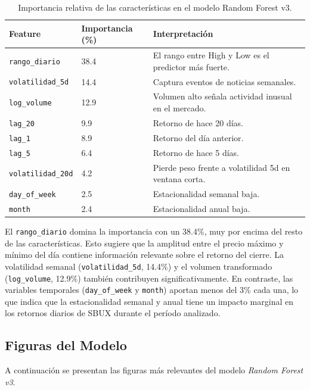 \documentclass[12pt,a4paper]{article}
\begin{document}
\begin{table}[H]
\centering
\caption{Importancia relativa de las características en el modelo Random Forest v3.}
\label{tab:importancia}
\small
\begin{tabular}{lp{2.5cm}p{7cm}}
\toprule
\textbf{Feature} & \textbf{Importancia (\%)} & \textbf{Interpretaci\'on} \\
\midrule
\texttt{rango\_diario}      & 38.4 & El rango entre High y Low es el predictor m\'as fuerte. \\
\texttt{volatilidad\_5d}    & 14.4 & Captura eventos de noticias semanales. \\
\texttt{log\_volume}        & 12.9 & Volumen alto se\~nala actividad inusual en el mercado. \\
\texttt{lag\_20}            & 9.9  & Retorno de hace 20 d\'ias. \\
\texttt{lag\_1}             & 8.9  & Retorno del d\'ia anterior. \\
\texttt{lag\_5}             & 6.4  & Retorno de hace 5 d\'ias. \\
\texttt{volatilidad\_20d}   & 4.2  & Pierde peso frente a volatilidad 5d en ventana corta. \\
\texttt{day\_of\_week}      & 2.5  & Estacionalidad semanal baja. \\
\texttt{month}              & 2.4  & Estacionalidad anual baja. \\
\bottomrule
\end{tabular}
\end{table}

El \texttt{rango\_diario} domina la importancia con un 38.4\%, muy por encima del resto de las características. Esto sugiere que la amplitud entre el precio máximo y mínimo del día contiene información relevante sobre el retorno del cierre. La volatilidad semanal (\texttt{volatilidad\_5d}, 14.4\%) y el volumen transformado (\texttt{log\_volume}, 12.9\%) también contribuyen significativamente. En contraste, las variables temporales (\texttt{day\_of\_week} y \texttt{month}) aportan menos del 3\% cada una, lo que indica que la estacionalidad semanal y anual tiene un impacto marginal en los retornos diarios de SBUX durante el período analizado.

\subsection{Figuras del Modelo}

A continuaci\'on se presentan las figuras m\'as relevantes del modelo \textit{Random Forest v3}.
\end{document}
